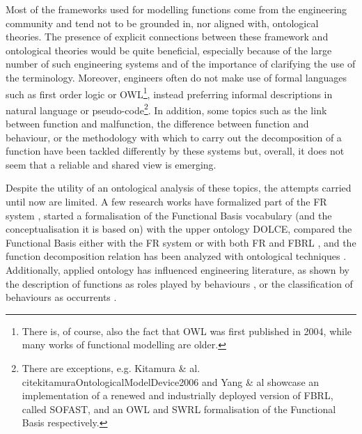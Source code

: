 \documentclass[sw]{iosart2x}
\newcommand{\DOLCE}{\textsc{DOLCE}\xspace} %
\newcommand{\OWL}{\textnormal{OWL}\xspace}
\begin{document}
Most of the frameworks used for modelling functions come from the engineering community and tend not to be grounded in, nor aligned with, ontological theories. The presence of explicit connections between these framework and ontological theories would be quite beneficial, especially because of the large number of such engineering systems and of the importance of clarifying the use of the terminology. 
Moreover, engineers often do not make use of formal languages such as first order logic or \OWL\footnote{There is, of course, also the fact that \OWL was first published in 2004, while many works of functional modelling are older.}, instead preferring informal descriptions in natural language or pseudo-code\footnote{There are exceptions, e.g. Kitamura \& al. cite{kitamuraOntologicalModelDevice2006} and Yang \& al \cite{yangFunctionSemanticRepresentation2010} %
showcase an implementation of a renewed and industrially deployed version of FBRL, called SOFAST, %
and an \OWL and SWRL formalisation of the Functional Basis %
respectively.}.
In addition, some topics such as the link between function and malfunction, the difference between function and behaviour, or the methodology with which to carry out the decomposition of a function have been tackled differently by these systems but, overall, it does not seem that a reliable and shared view is emerging.


Despite the utility of an ontological analysis of these topics, the attempts carried until now are limited. 
A few research works have formalized part of the FR system \cite{borgoFormalOntologicalPerspective2009}, started a formalisation of the Functional Basis vocabulary (and the conceptualisation it is based on) with the upper ontology \DOLCE \cite{borgoOntologicalRepresentationFunctional2009, borgoFormalizationFunctionsOperations2011}, compared the Functional Basis either with the FR system \cite{garbaczTwoOntologydrivenFormalisations2011} or with both FR and FBRL \cite{kitamuraDeepSemanticMapping2008}, and the function decomposition relation has been analyzed with ontological techniques \cite{vermaasFunctionalDecompositionMereology2009a,vermaasFormalImpossibilityAnalysing2013}. 
Additionally, applied ontology has influenced engineering literature, as shown by the description of functions as roles played by behaviours \cite{mizoguchiUnifiedDefinitionFunction2012, kitamuraOntologicalModelDevice2006, chandrasekaranFunctionDeviceRepresentation2000}, or the classification of behaviours as occurrents \cite{kitamuraOntologicalModelDevice2006}.
\end{document}
